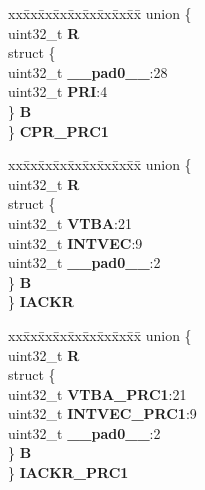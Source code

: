 \begin{DoxyCompactItemize}
\begin{tabbing}
\end{tabbing}\item 
\mbox{\label{structINTC__tag_a9a493736e7f97de994d3f4a3da0bad11}} 
\begin{tabbing}
xx\=xx\=xx\=xx\=xx\=xx\=xx\=xx\=xx\=\kill
union \{\\
\>uint32\_t {\bfseries R}\\
\>struct \{\\
\>\>uint32\_t {\bfseries \_\_pad0\_\_}:28\\
\>\>uint32\_t {\bfseries PRI}:4\\
\>\} {\bfseries B}\\
\} {\bfseries CPR\_PRC1}\\

\end{tabbing}\item 
\mbox{\label{structINTC__tag_a5845d0db1983593da32c5f25127cc0e8}} 
\begin{tabbing}
xx\=xx\=xx\=xx\=xx\=xx\=xx\=xx\=xx\=\kill
union \{\\
\>uint32\_t {\bfseries R}\\
\>struct \{\\
\>\>uint32\_t {\bfseries VTBA}:21\\
\>\>uint32\_t {\bfseries INTVEC}:9\\
\>\>uint32\_t {\bfseries \_\_pad0\_\_}:2\\
\>\} {\bfseries B}\\
\} {\bfseries IACKR}\\

\end{tabbing}\item 
\mbox{\label{structINTC__tag_a99ed4775e9d99bcfc30f8d8ca0fafb1b}} 
\begin{tabbing}
xx\=xx\=xx\=xx\=xx\=xx\=xx\=xx\=xx\=\kill
union \{\\
\>uint32\_t {\bfseries R}\\
\>struct \{\\
\>\>uint32\_t {\bfseries VTBA\_PRC1}:21\\
\>\>uint32\_t {\bfseries INTVEC\_PRC1}:9\\
\>\>uint32\_t {\bfseries \_\_pad0\_\_}:2\\
\>\} {\bfseries B}\\
\} {\bfseries IACKR\_PRC1}\\


\end{tabbing}
\end{DoxyCompactItemize}
